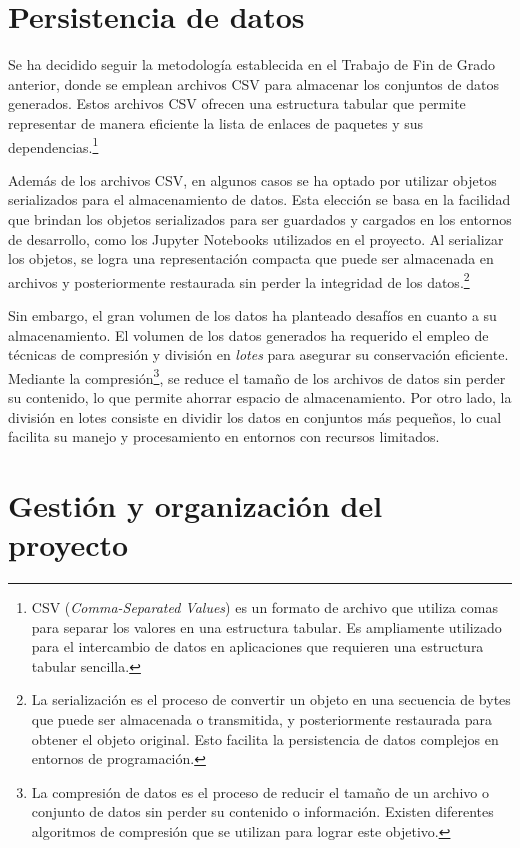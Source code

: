 \section{Persistencia de datos}

Se ha decidido seguir la metodología establecida en el Trabajo de Fin de Grado anterior, donde se 
emplean archivos CSV para almacenar los conjuntos de datos generados. Estos archivos CSV ofrecen una 
estructura tabular que permite representar de manera eficiente la lista de enlaces de paquetes y sus 
dependencias.\footnote{CSV (\textit{Comma-Separated Values}) es un formato de archivo que utiliza comas para 
separar los valores en una estructura tabular. Es ampliamente utilizado para el intercambio de datos 
en aplicaciones que requieren una estructura tabular sencilla.}

Además de los archivos CSV, en algunos casos se ha optado por utilizar objetos serializados para el 
almacenamiento de datos. Esta elección se basa en la facilidad que brindan los objetos serializados 
para ser guardados y cargados en los entornos de desarrollo, como los Jupyter Notebooks utilizados 
en el proyecto. Al serializar los objetos, se logra una representación compacta que puede ser 
almacenada en archivos y posteriormente restaurada sin perder la integridad de los 
datos.\footnote{La serialización es el proceso de convertir un objeto en una secuencia de 
bytes que puede ser almacenada o transmitida, y posteriormente restaurada para obtener el 
objeto original. Esto facilita la persistencia de datos complejos en entornos de programación.}

Sin embargo, el gran volumen de los datos ha planteado desafíos en cuanto a su almacenamiento. 
El volumen de los datos generados ha requerido el empleo de técnicas de compresión y división 
en \textit{lotes} para asegurar su conservación eficiente. Mediante la compresión\footnote{La compresión 
de datos es el proceso de reducir el tamaño de un 
archivo o conjunto de datos sin perder su contenido o información. Existen diferentes 
algoritmos de compresión que se utilizan para lograr este objetivo.}, se reduce el tamaño 
de los archivos de datos sin perder su contenido, lo que permite ahorrar espacio de 
almacenamiento. Por otro lado, la división 
en lotes consiste en dividir los datos en conjuntos más pequeños, lo cual facilita su manejo y 
procesamiento en entornos con recursos limitados.

\section{Gestión y organización del proyecto}

